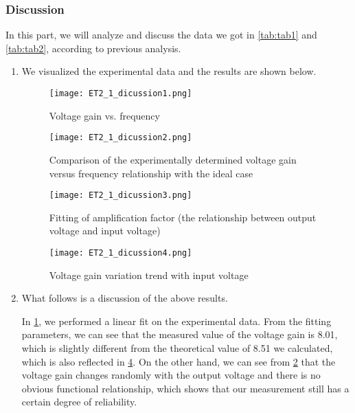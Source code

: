 \subsubsection{Discussion}
In this part, we will analyze and discuss the data we got in \cref{tab:tab1} and \cref{tab:tab2}, according to previous analysis.
\begin{enumerate}
	\item We visualized the experimental data and the results are shown below.
	
	\begin{figure}[htbp]
		\centering
		\texttt{[image: ET2\_1\_dicussion1.png]}
		\caption{Voltage gain vs. frequency}
		\label{fig:dicussion1}
	\end{figure}
	
	\begin{figure}[htbp]
		\centering
		\texttt{[image: ET2\_1\_dicussion2.png]}
		\caption{Comparison of the experimentally determined voltage gain versus frequency relationship with the ideal case}
		\label{fig:dicussion2}
	\end{figure}
	
	\begin{figure}[htbp]
		\centering
		\texttt{[image: ET2\_1\_dicussion3.png]}
		\caption{Fitting of amplification factor (the relationship between output voltage and input voltage)}
		\label{fig:dicussion3}
	\end{figure}
	
	\begin{figure}[htbp]
		\centering
		\texttt{[image: ET2\_1\_dicussion4.png]}
		\caption{Voltage gain variation trend with input voltage}
		\label{fig:dicussion4}
	\end{figure}
	
	\item What follows is a discussion of the above results.
	
	In \cref{fig:dicussion1}, we performed a linear fit on the experimental data. From the fitting parameters, we can see that the measured value of the voltage gain is 8.01, which is slightly different from the theoretical value of 8.51 we calculated, which is also reflected in \cref{fig:dicussion4}. On the other hand, we can see from \cref{fig:dicussion2} that the voltage gain changes randomly with the output voltage and there is no obvious functional relationship, which shows that our measurement still has a certain degree of reliability.
	

\end{enumerate}

